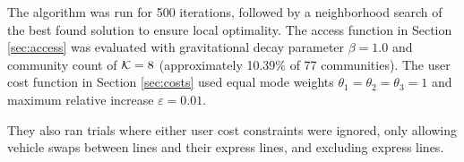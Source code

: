 The algorithm was run for 500 iterations, followed by a neighborhood search of the best found solution to ensure local optimality. The access function in Section \ref{sec:access} was evaluated with gravitational decay parameter $\beta = 1.0$ and community count of $\mathcal{K} = 8$ (approximately 10.39\% of 77 communities). The user cost function in Section \ref{sec:costs} used equal mode weights $\theta_1=\theta_2=\theta_3 = 1$ and maximum relative increase $\varepsilon = 0.01$.

They also ran trials where either user cost constraints were ignored, only allowing vehicle swaps between lines and their express lines, and excluding express lines.

